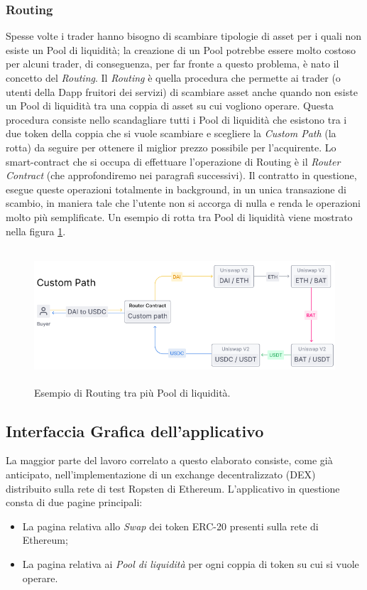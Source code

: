 \subsubsection{Routing }\makeatletter{}\makeatother
\label{Routing}
Spesse volte i trader hanno bisogno di scambiare tipologie di asset per i quali non esiste un Pool di liquidità; la creazione di un Pool potrebbe essere molto costoso per alcuni trader, di conseguenza, per far fronte a questo problema, è nato il concetto del \textit{Routing}.
Il \textit{Routing} è quella procedura che permette ai trader (o utenti della Dapp fruitori dei servizi) di scambiare asset anche quando non esiste un Pool di liquidità tra una coppia di asset su cui vogliono operare.
Questa procedura consiste nello scandagliare tutti i Pool di liquidità che esistono tra i due token della coppia che si vuole scambiare e scegliere la \textit{Custom Path} (la rotta) da seguire per ottenere il miglior prezzo possibile per l'acquirente. Lo smart-contract che si occupa di effettuare l'operazione di Routing è il \textit{Router Contract} (che approfondiremo nei paragrafi successivi). Il contratto in questione, esegue queste operazioni totalmente in background, in un unica transazione di scambio, in maniera tale che l'utente non si accorga di nulla e renda le operazioni molto più semplificate. Un esempio di rotta tra Pool di liquidità viene mostrato nella figura \ref{routing}.

\begin{figure}[h]
    \centering
    \includegraphics[width=13cm,height=5cm]{Immagini/Routing.png}
    \caption[Custom Path per il Routing tra pool di liquidità]{Esempio di Routing tra più Pool di liquidità.}
    \label{routing}
\end{figure}

\subsection{Interfaccia Grafica dell'applicativo}\label{UI_dex}
La maggior parte del lavoro correlato a questo elaborato consiste, come già anticipato, nell'implementazione di un exchange decentralizzato (DEX) distribuito sulla rete di test Ropsten di Ethereum. L'applicativo in questione consta di due pagine principali:
\begin{itemize}
\item La pagina relativa allo \textit{Swap} dei token ERC-20 presenti sulla rete di Ethereum;
\item La pagina relativa ai \textit{Pool di liquidità} per ogni coppia di token su cui si vuole operare.
\end{itemize}

